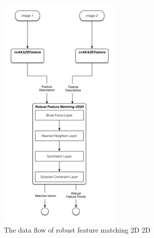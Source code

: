  \begin{figure}[H]
  \centering
  \includegraphics[width=60mm]{figures/robust_feature_matching_2D_2D}
  \caption{The data flow of robust feature matching 2D 2D}\label{fig:robust_feature_matching_2D_2D}
\end{figure}

